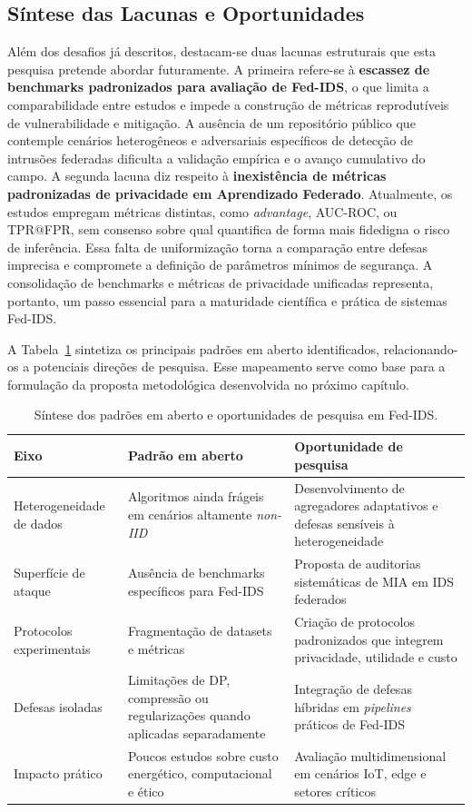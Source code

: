 \documentclass[
	12pt,				%
	openright,			%
	oneside,			%
	a4paper,			%
	english,			%
	french,				%
	spanish,			%
	brazil,				%
	]{abntex2}
\begin{document}
\subsection{Síntese das Lacunas e Oportunidades}
Além dos desafios já descritos, destacam-se duas lacunas estruturais que esta pesquisa pretende abordar futuramente. A primeira refere-se à \textbf{escassez de benchmarks padronizados para avaliação de Fed-IDS}, o que limita a comparabilidade entre estudos e impede a construção de métricas reprodutíveis de vulnerabilidade e mitigação. A ausência de um repositório público que contemple cenários heterogêneos e adversariais específicos de detecção de intrusões federadas dificulta a validação empírica e o avanço cumulativo do campo. A segunda lacuna diz respeito à \textbf{inexistência de métricas padronizadas de privacidade em Aprendizado Federado}. Atualmente, os estudos empregam métricas distintas, como \textit{advantage}, AUC-ROC, ou TPR@FPR, sem consenso sobre qual quantifica de forma mais fidedigna o risco de inferência. Essa falta de uniformização torna a comparação entre defesas imprecisa e compromete a definição de parâmetros mínimos de segurança. A consolidação de benchmarks e métricas de privacidade unificadas representa, portanto, um passo essencial para a maturidade científica e prática de sistemas Fed-IDS.

A Tabela~\ref{tab:discussoes_aberto} sintetiza os principais padrões em aberto identificados, relacionando-os a potenciais direções de pesquisa. Esse mapeamento serve como base para a formulação da proposta metodológica desenvolvida no próximo capítulo.

\begin{table}[H]
\centering
\footnotesize
\caption{Síntese dos padrões em aberto e oportunidades de pesquisa em Fed-IDS.}
\label{tab:discussoes_aberto}
\begin{tabular}{p{3.5cm}p{6.5cm}p{5.0cm}}
\toprule
\textbf{Eixo} & \textbf{Padrão em aberto} & \textbf{Oportunidade de pesquisa} \\
\midrule
Heterogeneidade de dados & Algoritmos ainda frágeis em cenários altamente \textit{non-IID} & Desenvolvimento de agregadores adaptativos e defesas sensíveis à heterogeneidade \\
Superfície de ataque & Ausência de benchmarks específicos para Fed-IDS & Proposta de auditorias sistemáticas de MIA em IDS federados \\
Protocolos experimentais & Fragmentação de datasets e métricas & Criação de protocolos padronizados que integrem privacidade, utilidade e custo \\
Defesas isoladas & Limitações de DP, compressão ou regularizações quando aplicadas separadamente & Integração de defesas híbridas em \textit{pipelines} práticos de Fed-IDS \\
Impacto prático & Poucos estudos sobre custo energético, computacional e ético & Avaliação multidimensional em cenários IoT, edge e setores críticos \\
\bottomrule
\end{tabular}
\end{table}
\end{document}
